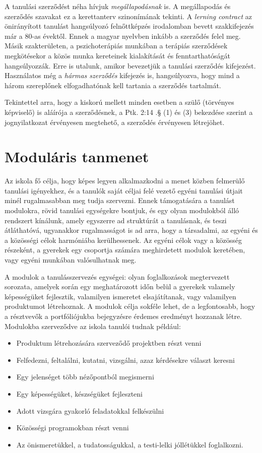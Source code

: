 A tanulási szerződést néha hívjuk \emph{megállapodásnak} is. A megállapodás és szerződés szavakat ez a kerettanterv szinonímának tekinti. A \emph{lerning contract} az önirányított tanulást hangsúlyozó felnőttképzés irodalomban
bevett szakkifejezés már a 80-as évektől\cite{Malcolm77}. Ennek a magyar nyelvben inkább a szerződés felel meg. Másik szakterületen, a pszichoterápiás munkában a terápiás szerződések megkötésekor a közös munka kereteinek kialakítását és fenntarthatóságát hangsúlyozzák.\cite{pszichoterapia} Erre is utalunk, amikor bevezetjük a tanulási szerződés kifejezést. Használatos még a \emph{hármas szerződés} kifejezés is, hangsúlyozva, hogy mind a három szereplőnek elfogadhatónak kell tartania a szerződés tartalmát.

Tekintettel arra, hogy a kiskorú mellett minden esetben a szülő (törvényes képviselő) is aláírója a szerződésnek, a Ptk. 2:14 .§ (1) és (3) bekezdése szerint a jognyilatkozat érvényesen megtehető, a szerződés érvényesen létrejöhet.

\section{Moduláris tanmenet}
\label{sec:modularis_tanmenet}

Az iskola fő célja, hogy képes legyen alkalmazkodni a menet közben felmerülő tanulási igényekhez, és a tanulók saját céljai felé vezető egyéni tanulási útjait minél rugalmasabban meg tudja szervezni. Ennek támogatására a tanulást modulokra, rövid tanulási egységekre bontjuk, és egy olyan modulokból álló rendszert kínálunk, amely egyszerre ad struktúrát a tanulásnak, és teszi átláthatóvá, ugyanakkor rugalmasságot is ad arra, hogy a társadalmi, az egyéni és a közösségi célok harmóniába kerülhessenek. Az egyéni célok vagy a közösség részeként, a gyerekek egy csoportja számára meghirdetett modulok keretében, vagy egyéni munkában valósulhatnak meg.

A modulok a tanulásszervezés egységei: olyan foglalkozások megtervezett sorozata, amelyek során egy meghatározott időn belül a gyerekek valamely képességüket fejlesztik, valamilyen ismeretet elsajátítanak, vagy valamilyen produktumot létrehoznak. A modulok célja sokféle lehet, de a legfontosabb, hogy a résztvevők a portfóliójukba bejegyzésre érdemes eredményt hozzanak létre. Modulokba szerveződve az iskola tanulói tudnak például:

\begin{itemize}
\item Produktum létrehozására szerveződő projektben részt venni
\item Felfedezni, feltalálni, kutatni, vizsgálni, azaz kérdésekre választ keresni
\item Egy jelenséget több nézőpontból megismerni
\item Egy képességüket, készségüket fejleszteni
\item Adott vizsgára gyakorló feladatokkal felkészülni
\item Közösségi programokban részt venni
\item Az önismeretükkel, a tudatosságukkal, a testi-lelki jóllétükkel foglalkozni.
\end{itemize}

